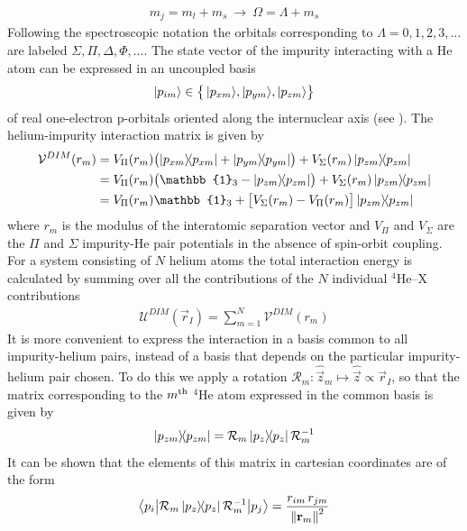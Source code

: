 			\begin{align}
				m_j=m_l+m_s\:\longrightarrow\:\Omega=\Lambda+m_s
			\end{align}
			 Following the spectroscopic notation the orbitals corresponding to $\Lambda=0,1,2,3,\ldots$ are labeled $\Sigma,\Pi,\Delta,\Phi,\ldots$. The state vector of the impurity interacting with a He atom can be expressed in an uncoupled basis
			\begin{align}
				 \ket{p_{im}}\in\qty\big{\,\ket{p_{xm}}\!,\ket{p_{ym}}\!,\ket{p_{zm}}} \label{eq:dim-basis}
			\end{align}
			of real one-electron p-orbitals oriented along the internuclear axis (see ). The helium-impurity interaction matrix is given by
			\begin{align}
				\mathcal{V}^{DIM}(r_m) &= V_{\Pi}(r_m)\qty\big(\dyad{p_{xm}}+\dyad{p_{ym}})+V_{\Sigma}(r_m)\dyad{p_{zm}} \nonumber \\
					&= V_{\Pi}(r_m)\qty\big(\mathbb{1}_3-\dyad{p_{zm}})+V_{\Sigma}(r_m)\dyad{p_{zm}} \nonumber \\
					&=V_{\Pi}(r_m)\mathbb{1}_3+\qty\big[V_{\Sigma}(r_m)-V_{\Pi}(r_m)]\dyad{p_{zm}}
			\end{align}	
			where $r_m$ is the modulus of the interatomic separation vector and $V_\Pi$ and $V_\Sigma$ are the $\Pi$ and $\Sigma$ impurity-He pair potentials in the absence of spin-orbit coupling. For a system consisting of $N$ helium atoms the total interaction energy is calculated by summing over all the contributions of the $N$ individual $^4$He--X contributions
			\begin{align}
				\mathcal{U}^{DIM}(\vec{r}_I)=\sum_{m=1}^{N}\mathcal{V}^{DIM}(r_m)
			\end{align}
			It is more convenient to express the interaction in a basis common to all impurity-helium pairs, instead of a basis that depends on the particular impurity-helium pair chosen. To do this we apply a rotation $\mathcal{R}_m:\hat{\vec{z}}_m\mapsto\hat{\vec{z}}\propto\vec{r}_I$, so that the matrix corresponding to the $m^{\rm th}$ $^4$He atom expressed in the common basis is given by
			\begin{align}
				\dyad{p_{zm}} = \mathcal{R}_m\dyad{p_z}\mathcal{R}_m^{-1}
			\end{align}
			It can be shown that the elements of this matrix in cartesian coordinates are of the form
			\begin{equation}
				\mel**{p_i}{\mathcal{R}_m\dyad{p_z}\mathcal{R}_m^{-1}}{p_j} = \frac{r_{im}\,r_{jm}}{\norm{\vec{r}_m}^2}		\label{eq39}
			\end{equation}	
